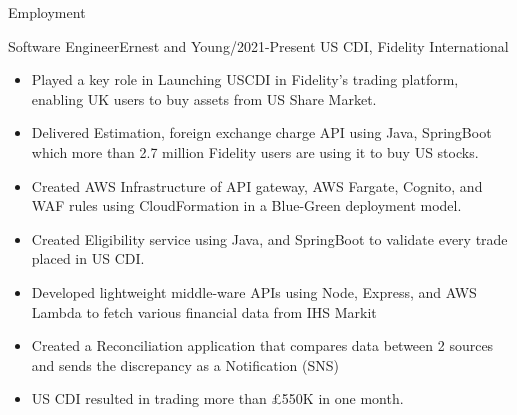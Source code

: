 \documentclass[]{mcdowellcv}
\begin{document}
    \begin{cvsection}{Employment}
        \begin{cvsubsection}{Software Engineer}{Ernest and Young}{/2021-Present}
            US CDI,	Fidelity International
            \begin{itemize}
                \item Played a key role in Launching USCDI in Fidelity's trading platform, enabling UK users to buy assets from US Share Market.
                \item Delivered Estimation, foreign exchange charge API using Java, SpringBoot which more than 2.7 million
                Fidelity users are using it to buy US stocks.
                \item Created AWS Infrastructure of API gateway, AWS Fargate, Cognito, and WAF rules using CloudFormation in a Blue-Green deployment model.
                \item Created Eligibility service using Java, and SpringBoot to validate every trade placed in US CDI.
                \item Developed lightweight middle-ware APIs using Node, Express, and AWS Lambda to fetch various financial data from IHS Markit
                \item Created a Reconciliation application that compares data between 2 sources and sends the discrepancy as a
                Notification (SNS)
                \item US CDI resulted in trading more than £550K in one month.
            \end{itemize}
        \end{cvsubsection}


\end{cvsection}
\end{document}
